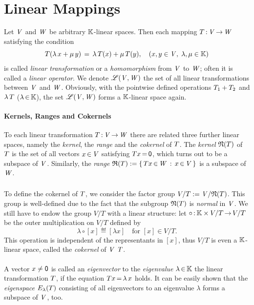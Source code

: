 \documentclass[11pt,twoside]{article}
\begin{document}
\section{Linear Mappings}
Let $\mathit{V}$ and $\mathit{W}$ be arbitrary ${\mathbb{K}}$-linear spaces.
Then each mapping ${T} {\,:\,}\mathit{V} {\,\to\,} \mathit{W}$ satisfying the condition
\[
{T}(\lambda \, x + \mu \, y) \,=\, \lambda \, {T}(x) + \mu \, {T}(y),
\quad (x,y \in \mathit{V}, \; \lambda, \mu \in {\mathbb{K}})
\]
is called \textit{linear trans\-formation} or
a \textit{homo\-morphism} from $\mathit{V}$ to $\mathit{W}$;
often it is called a \textit{linear operator}.
We denote $\mathscr{L}(\mathit{V},\mathit{W})$ the set of all
linear trans\-formations between $\mathit{V}$ and $\mathit{W}$.
Obviously,
with the pointwise defined operations
${T}_1 + {T}_2$ and $\lambda \, {T}$ ($\lambda {\,\in\,} {\mathbb{K}}$),
the set $\mathscr{L}(\mathit{V},\mathit{W})$ forms a ${\mathbb{K}}$-linear space again.

\paragraph{Kernels, Ranges and Cokernels}
To each linear trans\-formation ${T} {\,:\,}\mathit{V} {\,\to\,} \mathit{W}$
there are related three further linear spaces,
namely the \textit{kernel}, the \textit{range}
and the \textit{cokernel} of ${T}$.
The \textit{kernel} $\mathfrak{N}({T})$ of
${T}$ is the set of all vectors $x {\,\in\,} \mathit{V}$ satisfying ${T} x {\,=\,} {\mathsf{0}}$,
which turns out to be a subspace of $\mathit{V}$.
Similarly,
the \textit{range} $\mathfrak{R}({T}) := \{ \, {T} x {\,\in\,} \mathit{W} \,: \, x {\,\in\,} \mathit{V} \, \}$
is a subspace of $\mathit{W}$.

\subparagraph{}
To define the cokernel of ${T}$,
we consider the factor group $V/T := \mathit{V} / \mathfrak{N}({T})$.
This group is well-defined due to the fact
that the subgroup $\mathfrak{N}({T})$ is \textit{normal} in $\mathit{V}$.
We still have to endow the group $V/T$ with a linear structure:
let
$\circ {\,:\,} {\mathbb{K}} \times V/T {\,\to\,} V/T$
be the outer multiplication on $V/T$ defined by
\[
\lambda \circ [x] \eqdef
[\lambda x] \quad \mbox{for } [x] \in V/T.
\]
This operation is independent of the representants in $[x]$,
thus $V/T$ is even a ${\mathbb{K}}$-linear space,
called the \textit{cokernel} of $\mathit{V}$ {\wrt} ${T}$.

\paragraph{}
A vector $x \neq {\mathsf{0}}$ is called an \textit{eigenvector} to the
\textit{eigenvalue} $\lambda {\,\in\,} {\mathbb{K}}$ {\wrt} the linear transformation ${T}$,
if the equation ${T} x {\,=\,} \lambda \, x$ holds.
It can be easily shown
that the \textit{eigenspace} $E_{\lambda}({T})$ 
consisting of all eigenvectors to an eigenvalue $\lambda$ 
forms a subspace of $\mathit{V}$, too.
\end{document}
